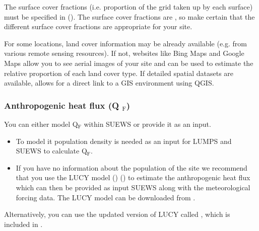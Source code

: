 \documentclass[letterpaper,10pt,english]{sphinxmanual}
\begin{document}
The surface cover fractions (i.e. proportion of the grid taken up by
each surface) must be specified in
{\hyperref[\detokenize{input_files/SUEWS_SiteInfo/SUEWS_SiteSelect:suews-siteselect-txt}]{}} (). The surface cover
fractions are , so make certain that the different surface
cover fractions are appropriate for your site.

For some locations, land cover information may be already available
(e.g. from various remote sensing resources). If not, websites like Bing
Maps and Google Maps allow you to see aerial images of your site and can
be used to estimate the relative proportion of each land cover type. If
detailed spatial datasets are available,
 allows for a direct link
to a GIS environment using QGIS.


\subsubsection{Anthropogenic heat flux (Q $_{\text{F}}$)}
\label{\detokenize{prepare-to-run-the-model:anthropogenic-heat-flux-qf-1}}\label{\detokenize{prepare-to-run-the-model:anthropogenic-heat-flux-q-f}}
You can either model Q$_{\text{F}}$ within SUEWS or provide it as an input.
\begin{itemize}
\item {} 
To model it population density is needed as an input for LUMPS and
SUEWS to calculate Q$_{\text{F}}$.

\item {} 
If you have no information about the population of the site we
recommend that you use the LUCY model \label{\detokenize{prepare-to-run-the-model:id7}}{\hyperref[\detokenize{references:lucy}]{\sphinxcrossref{{[}lucy{]}}}} ()  \label{\detokenize{prepare-to-run-the-model:id8}}{\hyperref[\detokenize{references:lucy2}]{\sphinxcrossref{{[}lucy2{]}}}} () to estimate the
anthropogenic heat flux which can then be provided as input SUEWS
along with the meteorological forcing data. The LUCY model can be
downloaded from .

\end{itemize}

Alternatively, you can use the updated version of LUCY called
, which is included in
.
\end{document}
